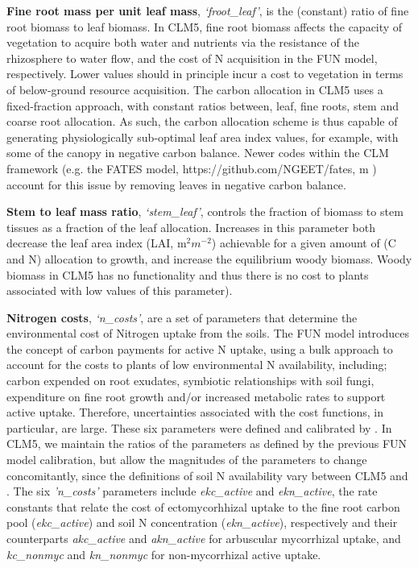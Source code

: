 \documentclass[draft,linenumbers]{agujournal}
\begin{document}
\textbf{Fine root mass per unit leaf mass}, \emph{`froot\_leaf'}, is the (constant) ratio of fine root biomass to leaf biomass. In CLM5, fine root biomass affects the capacity of vegetation to acquire both water and nutrients via the resistance of the rhizosphere to water flow, and the cost of N acquisition in the FUN model, respectively. Lower values should in principle incur a cost to vegetation in terms of below-ground resource acquisition.  The carbon allocation in CLM5 uses a fixed-fraction approach, with constant ratios between, leaf, fine roots, stem and coarse root allocation. As such, the carbon allocation scheme is thus capable of generating physiologically sub-optimal leaf area index values, for example, with some of the canopy in negative carbon balance. Newer codes within the CLM framework (e.g. the FATES model, https://github.com/NGEET/fates, \cite{fisher2015}m \cite{fisher2018vegetation}) account for this issue by removing leaves in negative carbon balance. 

 \textbf{Stem to leaf mass ratio}, \emph{`stem\_leaf'}, controls the fraction of biomass to stem tissues as a fraction of the leaf allocation. Increases in this parameter both decrease the leaf area index (LAI, m$^{2} m^{-2}$) achievable for a given amount of (C and N) allocation to growth, and increase the equilibrium woody biomass. Woody biomass in CLM5 has no functionality and thus there is no cost to plants associated with low values of this parameter).

\textbf{Nitrogen costs}, \emph{`n\_costs'}, are a set of parameters that determine the environmental cost of Nitrogen uptake from the soils. The FUN model introduces the concept of carbon payments for active N uptake, using a bulk approach to account for the costs to plants of low environmental N availability, including; carbon expended on root exudates, symbiotic relationships with soil fungi, expenditure on fine root growth and/or increased metabolic rates to support active uptake. Therefore, uncertainties associated with the cost functions, in particular, are large. These six parameters were defined and calibrated by \cite{brzostek2014}. In CLM5, we maintain the ratios of the parameters as defined by the previous FUN model calibration, but allow the magnitudes of the parameters to change concomitantly, since the definitions of soil N availability vary between CLM5 and \cite{brzostek2014}. The six \emph{'n\_costs'} parameters include \emph{ekc\_active} and \emph{ekn\_active}, the rate constants that relate the cost of ectomycorhhizal uptake to the fine root carbon pool (\emph{ekc\_active}) and soil N concentration (\emph{ekn\_active}), respectively and their counterparts \emph{akc\_active} and \emph{akn\_active} for arbuscular mycorrhizal uptake, and \emph{kc\_nonmyc} and \emph{kn\_nonmyc} for non-mycorrhizal active uptake. 
\end{document}
